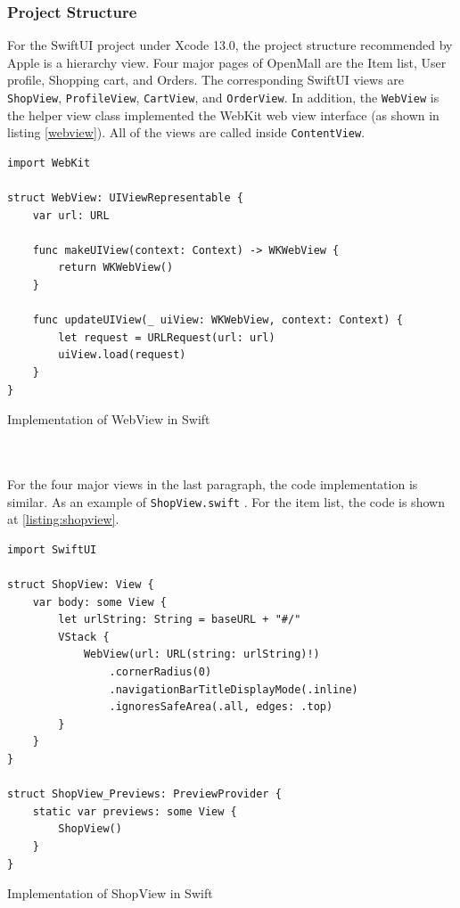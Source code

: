 \documentclass{article}
\begin{document}
\subsubsection{Project Structure}

For the SwiftUI project under Xcode 13.0, the project structure recommended by Apple is a hierarchy view. Four major pages of OpenMall are the Item list, User profile, Shopping cart, and Orders. The corresponding SwiftUI views are \verb|ShopView|, \verb|ProfileView|, \verb|CartView|, and \verb|OrderView|. In addition, the \verb|WebView| is the helper view class implemented the WebKit web view interface (as shown in listing \ref{webview}). All of the views are called inside \verb|ContentView|.

\begin{listing}[!htp]
\begin{verbatim}
import WebKit

struct WebView: UIViewRepresentable {
    var url: URL
    
    func makeUIView(context: Context) -> WKWebView {
        return WKWebView()
    }
    
    func updateUIView(_ uiView: WKWebView, context: Context) {
        let request = URLRequest(url: url)
        uiView.load(request)
    }
}
\end{verbatim}
\caption{Implementation of WebView in Swift}
\label{webview}
\end{listing}

\leavevmode
\\\\
For the four major views in the last paragraph, the code implementation is similar. As an example of \verb|ShopView.swift| . For the item list, the code is shown at \ref{listing:shopview}.

\begin{listing}[!htp]
\begin{verbatim}
import SwiftUI

struct ShopView: View {
    var body: some View {
        let urlString: String = baseURL + "#/"
        VStack {
            WebView(url: URL(string: urlString)!)
                .cornerRadius(0)
                .navigationBarTitleDisplayMode(.inline)
                .ignoresSafeArea(.all, edges: .top)
        }
    }
}

struct ShopView_Previews: PreviewProvider {
    static var previews: some View {
        ShopView()
    }
}
\end{verbatim}
\caption{Implementation of ShopView in Swift}
\label{listing:shopview}
\end{listing}
\end{document}
